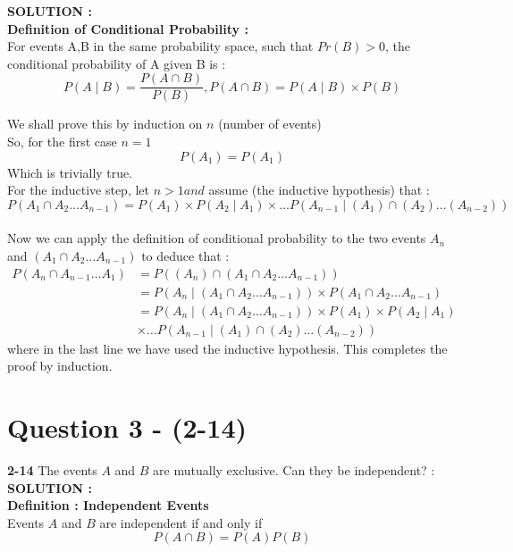 \documentclass{article}
\begin{document}
\hspace{1em} \large{\textbf{SOLUTION :}} \\
\textbf{Definition of Conditional Probability :}\\
For events A,B in the same probability space, such that $Pr(B) > 0$, the conditional probability of A given B is : \\
$$P(A \mid B) = \frac{P(A \cap B)}{P(B)} ,
P(A \cap B) = P(A \mid B) \times P(B) $$

 
We shall prove this by induction on $n$ (number of events)\\
So, for the first case $ n = 1 $ \\
$$P(A_1) = P(A_1)$$
Which is trivially true. \\
For the inductive step, let $n > 1 and$ assume (the inductive hypothesis) that : \\
$$P(A_1 \cap A_2 \dots A_{n-1}) = P(A_1) \times P(A_2 \mid A_1) \times \dots P(A_{n-1} \mid (A_1) \cap (A_2) \dots (A_{n-2})) $$ \\
Now we can apply the definition of conditional probability to the two events $A_n$ and $(A_1 \cap A_2 \dots A_{n-1})$ to deduce that : \\
\begin{align*}
	P(A_n \cap A_{n-1} \dots A_1) &= P((A_n) \cap (A_1 \cap A_2 \dots A_{n-1})) \\
	&= P(A_n \mid (A_1 \cap A_2 \dots A_{n-1})) \times P(A_1 \cap A_2 \dots A_{n-1}) \\
	&= P(A_n \mid (A_1 \cap A_2 \dots A_{n-1})) \times P(A_1) \times P(A_2 \mid A_1) \\ &\times \dots P(A_{n-1} \mid (A_1) \cap (A_2) \dots (A_{n-2})) 
\end{align*}
where in the last line we have used the inductive hypothesis. This completes the proof by induction.

\section{Question 3 - (2-14)}
\label{Q3}
\textbf{2-14}  The events $A$ and $B$ are mutually exclusive. Can they be independent?  : \\

\hspace{1em} \large{\textbf{SOLUTION :}} \\

\textbf{Definition : Independent Events} \\
Events $A$ and $B$ are independent if and only if \\
$$P(A \cap B) = P(A) P(B)  $$
\end{document}
